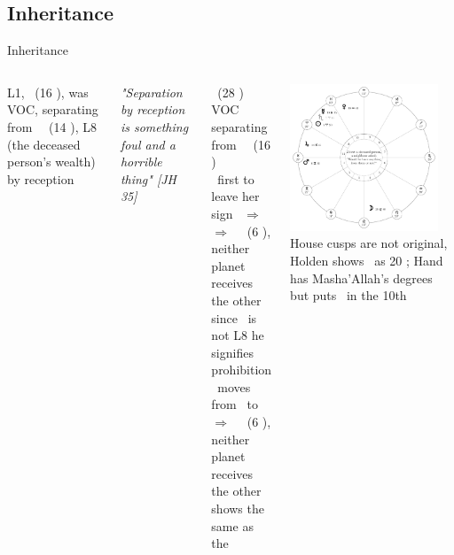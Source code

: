 \subsection{Inheritance}
\begin{frame}[t]{Inheritance}
\begin{columns}[T, onlytextwidth]
L1, \Venus\ (16 \Aquarius), was VOC, separating from \Square\  \Jupiter\ (14 \Taurus), L8 (the deceased person's wealth) by reception
\begin{block}{}
\textsl{"Separation by reception is something foul and a horrible thing" [JH 35]}
\end{block}
\Moon\ (28 \Leo) VOC separating from \Opposition\ \Venus\ (16 \Aquarius) \\
\Moon\ first to leave her sign \Leo\ $\Rightarrow$ \Virgo \\
$\Rightarrow$ \Trine\ \Mars\ (6 \Taurus), neither planet receives the other \\
since \Mars\ is not L8 he signifies prohibition \\
\vspace{0.25cm}
\Venus\ moves from \Aquarius\ to \Pisces \\
$\Rightarrow$ \Sextile\ \Mars\ (6 \Taurus), neither planet receives the other \\
shows the same as the \Moon

\begin{center}
{\includegraphics[width=0.9\textwidth]{charts/40-chart-inheritance}} \\
\small
House cusps are not original, Holden shows \Mercury\ as 20 \Pisces; Hand has Masha'Allah's degrees but puts \Mercury\ in the 10th
\end{center}
\end{columns}
\end{frame}